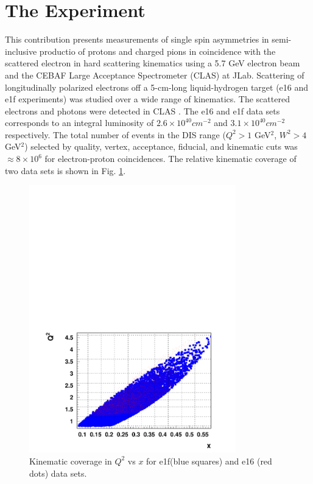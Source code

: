 \documentclass[11pt,a4paper]{article}
\begin{document}
\section{The Experiment}

This contribution presents measurements of
single spin asymmetries  in semi-inclusive productio of protons and charged pions in coincidence with the scattered electron in hard scattering kinematics  using a 5.7 GeV
electron beam and the CEBAF Large Acceptance 
Spectrometer (CLAS) \cite{Mecking:2003zu} at JLab.
Scattering of  longitudinally polarized electrons off
a 5-cm-long liquid-hydrogen target (e16 and e1f experiments) was 
studied over a wide range of kinematics.
The scattered electrons and photons were detected in
CLAS \cite{Mecking:2003zu}. The e16 and e1f data sets corresponds to an integral 
luminosity of $2.6\times 10^{40} cm^{-2}$ and  $3.1\times 10^{40} cm^{-2}$ respectively. 
The total number of events   
in the DIS range ($Q^2>1$ GeV$^2$, $W^2>4$ GeV$^2$)
selected by  quality, vertex, acceptance, fiducial, and kinematic cuts 
was $\approx 8\times 10^6$ for electron-proton coincidences.
The relative kinematic coverage of two data sets is shown in Fig. \ref{fig:xvsq2.e1fe16bins}.

\begin{figure}
\centering
\includegraphics[width=0.8\textwidth]{plots/xvsq2-e1fe16bins.pdf}
   \caption{ Kinematic coverage in  $Q^2$ vs $x$ for e1f(blue squares) and e16 (red dots) 
data sets.}
 \label{fig:xvsq2.e1fe16bins}
 \end{figure} 
\end{document}
